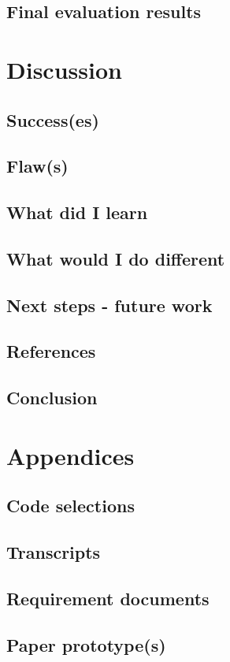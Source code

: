 \documentclass[]{report}
\begin{document}
\section{Final evaluation results}

\chapter{Discussion}

\section{Success(es)}

\section{Flaw(s)}

\section{What did I learn}

\section{What would I do different}

\section{Next steps - future work}

\section{References}

{}



\section{Conclusion}

\chapter{Appendices}
\section{Code selections}

\section{Transcripts}

\section{Requirement documents}

\section{Paper prototype(s)}
\end{document}
